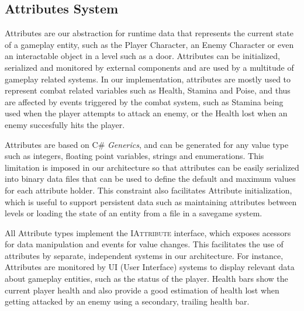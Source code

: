 
\subsection{Attributes System}

Attributes are our abstraction for runtime data that represents the current state of a gameplay entity, such as the Player Character, an Enemy Character or even an interactable object in a level such as a door. Attributes can be initialized, serialized and monitored by external components and are used by a multitude of gameplay related systems. In our implementation, attributes are mostly used to represent combat related variables such as Health, Stamina and Poise, and thus are affected by events triggered by the combat system, such as Stamina being used when the player attempts to attack an enemy, or the Health lost when an enemy succesfully hits the player.

Attributes are based on \textsc{C\#} \emph{Generics}, and can be generated for any value type such as integers, floating point variables, strings and enumerations. This limitation is imposed in our architecture so that attributes can be easily serialized into binary data files that can be used to define the default and maximum values for each attribute holder. This constraint also facilitates Attribute initialization, which is useful to support persistent data such as maintaining attributes between levels  or loading the state of an entity from a file in a savegame system. 

All Attribute types implement the \textsc{IAttribute} interface, which exposes acessors for data manipulation and events for value changes. This facilitates the use of attributes by separate, independent systems in our architecture. For instance, Attributes are monitored by UI (User Interface) systems to display relevant data about gameplay entities, such as the status of the player. Health bars show the current player health and also provide a good estimation of health lost when getting attacked by an enemy using a secondary, trailing health bar.

